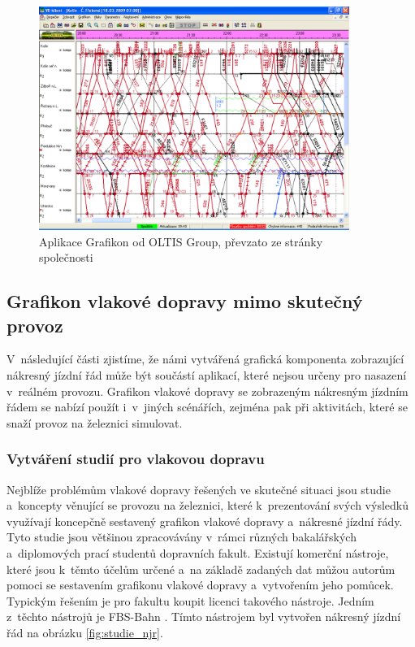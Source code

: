 \begin{figure}[ht]
	\centering
	\includegraphics[width=0.9\textwidth]{../img/kap1_ISOR_window}
	\caption{Aplikace Grafikon od OLTIS Group, převzato ze stránky společnosti~\cite{ISOR_CDS}}
	\label{fig:oltis_window}
\end{figure}

\subsection*{Grafikon vlakové dopravy mimo skutečný provoz}
\label{model_gvd}
V~následující části zjistíme, že námi vytvářená grafická komponenta zobrazující nákresný jízdní řád může být součástí aplikací, které nejsou určeny pro nasazení v~reálném provozu. Grafikon vlakové dopravy se zobrazeným nákresným jízdním řádem se nabízí použít i~v~jiných scénářích, zejména pak při aktivitách, které se snaží provoz na železnici simulovat.

\subsubsection{Vytváření studií pro vlakovou dopravu}
Nejblíže problémům vlakové dopravy řešených ve skutečné situaci jsou studie a~koncepty věnující se provozu na železnici, které k~prezentování svých výsledků využívají koncepčně sestavený grafikon vlakové dopravy a~nákresné jízdní řády. Tyto studie jsou většinou zpracovávány v~rámci různých bakalářských a~diplomových prací studentů dopravních fakult. Existují komerční nástroje, které jsou k~těmto účelům určené a~na základě zadaných dat můžou autorům pomoci se sestavením grafikonu vlakové dopravy a~vytvořením jeho pomůcek. Typickým řešením je pro fakultu koupit licenci takového nástroje. Jedním z~těchto nástrojů je FBS-Bahn \cite{FBS_BAHN}. Tímto nástrojem byl vytvořen nákresný jízdní řád na obrázku \ref{fig:studie_njr}.

